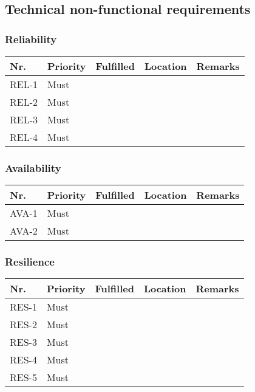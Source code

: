 \subsection{Technical non-functional requirements}
\subsubsection{Reliability}
\begin{table}[H]
	\begin{tabular}{lllll}
						    
		Nr.   & Priority & Fulfilled & Location & Remarks \\ \hline
		REL-1 & Must     & ~        & ~         & ~       \\ 
		REL-2 & Must     & ~        & ~         & ~       \\ 
		REL-3 & Must     & ~        & ~         & ~       \\ 
		REL-4 & Must     & ~        & ~         & ~       \\
						
	\end{tabular}
\end{table}

\subsubsection{Availability}
\begin{table}[H]
	\begin{tabular}{lllll}
						    
		Nr.   & Priority & Fulfilled & Location & Remarks \\ \hline
		AVA-1 & Must     & ~        & ~         & ~       \\ 
		AVA-2 & Must     & ~        & ~         & ~       \\
						
	\end{tabular}
\end{table}

\subsubsection{Resilience}
\begin{table}[H]
	\begin{tabular}{lllll}
						    
		Nr.   & Priority & Fulfilled & Location & Remarks \\ \hline
		RES-1 & Must     & ~        & ~         & ~       \\ 
		RES-2 & Must     & ~        & ~         & ~       \\ 
		RES-3 & Must     & ~        & ~         & ~       \\ 
		RES-4 & Must     & ~        & ~         & ~       \\ 
		RES-5 & Must     & ~        & ~         & ~       \\
						
	\end{tabular}
\end{table}

